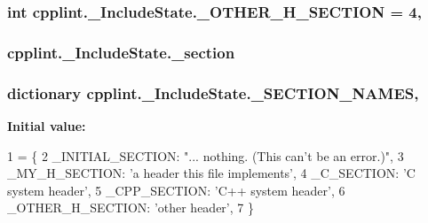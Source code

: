 \subsubsection[{\texorpdfstring{\+\_\+\+O\+T\+H\+E\+R\+\_\+\+H\+\_\+\+S\+E\+C\+T\+I\+ON}{_OTHER_H_SECTION}}]{\setlength{\rightskip}{0pt plus 5cm}int cpplint.\+\_\+\+Include\+State.\+\_\+\+O\+T\+H\+E\+R\+\_\+\+H\+\_\+\+S\+E\+C\+T\+I\+ON = 4\hspace{0.3cm}{\ttfamily [static]}, {\ttfamily [private]}}\hypertarget{classcpplint_1_1__IncludeState_a61762d0c9aa19bcfcea686d6d77d33d1}{}\label{classcpplint_1_1__IncludeState_a61762d0c9aa19bcfcea686d6d77d33d1}
\subsubsection[{\texorpdfstring{\+\_\+section}{_section}}]{\setlength{\rightskip}{0pt plus 5cm}cpplint.\+\_\+\+Include\+State.\+\_\+section\hspace{0.3cm}{\ttfamily [private]}}\hypertarget{classcpplint_1_1__IncludeState_ab1a8864f105dd145d84fe88ba04c3565}{}\label{classcpplint_1_1__IncludeState_ab1a8864f105dd145d84fe88ba04c3565}
\subsubsection[{\texorpdfstring{\+\_\+\+S\+E\+C\+T\+I\+O\+N\+\_\+\+N\+A\+M\+ES}{_SECTION_NAMES}}]{\setlength{\rightskip}{0pt plus 5cm}dictionary cpplint.\+\_\+\+Include\+State.\+\_\+\+S\+E\+C\+T\+I\+O\+N\+\_\+\+N\+A\+M\+ES\hspace{0.3cm}{\ttfamily [static]}, {\ttfamily [private]}}\hypertarget{classcpplint_1_1__IncludeState_af6d3c191f07229558c87b3327e274714}{}\label{classcpplint_1_1__IncludeState_af6d3c191f07229558c87b3327e274714}
{\bfseries Initial value\+:}
\begin{DoxyCode}
1 = \{
2       \_INITIAL\_SECTION: \textcolor{stringliteral}{"... nothing. (This can't be an error.)"},
3       \_MY\_H\_SECTION: \textcolor{stringliteral}{'a header this file implements'},
4       \_C\_SECTION: \textcolor{stringliteral}{'C system header'},
5       \_CPP\_SECTION: \textcolor{stringliteral}{'C++ system header'},
6       \_OTHER\_H\_SECTION: \textcolor{stringliteral}{'other header'},
7       \}
\end{DoxyCode}
